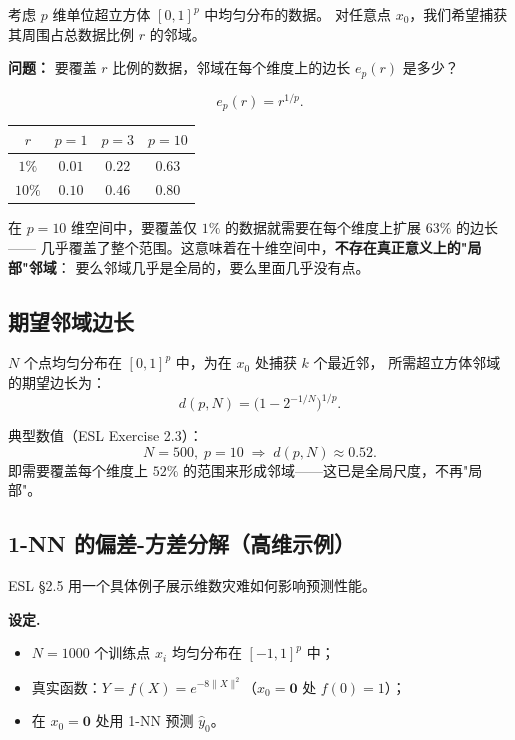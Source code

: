 考虑 $p$ 维单位超立方体 $[0,1]^p$ 中均匀分布的数据。
对任意点 $x_0$，我们希望捕获其周围占总数据比例 $r$ 的邻域。

\textbf{问题：} 要覆盖 $r$ 比例的数据，邻域在每个维度上的边长 $e_p(r)$ 是多少？

\begin{equation}\label{eq:ep_r}
    e_p(r) = r^{1/p}.
\end{equation}

\begin{center}
\renewcommand{\arraystretch}{1.4}
\begin{tabular}{c|c|c|c}
\toprule
$r$ & $p=1$ & $p=3$ & $p=10$ \\
\midrule
$1\%$  & $0.01$   & $0.22$  & \textbf{$0.63$} \\
$10\%$ & $0.10$   & $0.46$  & \textbf{$0.80$} \\
\bottomrule
\end{tabular}
\end{center}

在 $p=10$ 维空间中，要覆盖仅 $1\%$ 的数据就需要在每个维度上扩展 $63\%$ 的边长——
几乎覆盖了整个范围。这意味着在十维空间中，\textbf{不存在真正意义上的"局部"邻域}：
要么邻域几乎是全局的，要么里面几乎没有点。

\subsection{期望邻域边长}

$N$ 个点均匀分布在 $[0,1]^p$ 中，为在 $x_0$ 处捕获 $k$ 个最近邻，
所需超立方体邻域的期望边长为：
\begin{equation}\label{eq:d_pN}
    d(p, N) = \Big(1 - 2^{-1/N}\Big)^{1/p}.
\end{equation}

典型数值（ESL Exercise 2.3）：
\[
N = 500,\; p = 10 \;\Longrightarrow\; d(p, N) \approx 0.52.
\]
即需要覆盖每个维度上 $52\%$ 的范围来形成邻域——这已是全局尺度，不再"局部"。

\subsection{1-NN 的偏差-方差分解（高维示例）}

ESL \S 2.5 用一个具体例子展示维数灾难如何影响预测性能。

\textbf{设定.}
\begin{itemize}
    \item $N = 1000$ 个训练点 $x_i$ 均匀分布在 $[-1, 1]^p$ 中；
    \item 真实函数：$Y = f(X) = e^{-8\|X\|^2}$（$x_0 = \mathbf{0}$ 处 $f(0) = 1$）；
    \item 在 $x_0 = \mathbf{0}$ 处用 1-NN 预测 $\hat{y}_0$。
\end{itemize}

